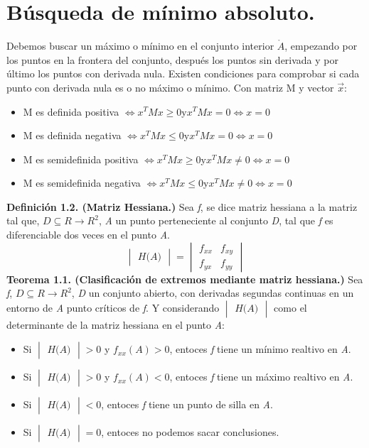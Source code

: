 \documentclass[a4paper,10pt]{article}
\begin{document}
\section{Búsqueda de mínimo absoluto.}
\noindent
Debemos buscar un máximo o mínimo en el conjunto interior $\mathring{A}$, empezando por los puntos en la frontera del conjunto, después los puntos sin derivada y por último los puntos con derivada nula. Existen condiciones para comprobar si cada punto con derivada nula es o no máximo o mínimo. Con matriz M y vector $\vec{x}$:
\begin{itemize}
\item M es definida positiva $\Longleftrightarrow x^TMx \geq 0$y$x^TMx=0\Leftrightarrow x=0$
\item M es definida negativa  $\Longleftrightarrow x^TMx \leq0$y$x^TMx=0\Leftrightarrow x=0$
\item M es semidefinida positiva  $\Longleftrightarrow x^TMx \geq0$y$x^TMx\neq0\Leftrightarrow x=0$
\item M es semidefinida negativa  $\Longleftrightarrow x^TMx \leq0$y$x^TMx\neq0\Leftrightarrow x=0$
\end{itemize}
\textbf{Definición 1.2. (Matriz Hessiana.)}
Sea \textit{f}, se dice matriz hessiana a la matriz tal que, $\textit{D} \subseteq R \rightarrow R^2$, \textit{A} un punto perteneciente al conjunto \textit{D}, tal que \textit{f} es diferenciable dos veces en el punto \textit{A}.
\[
\begin{vmatrix}\textit{H(A)}\end{vmatrix}=
\begin{vmatrix}
    f_{xx} & f_{xy} \\
    f_{yx} & f_{yy}
\end{vmatrix}
\]
\textbf{Teorema 1.1. (Clasificación de extremos mediante matriz hessiana.)}
Sea \textit{f}, $\textit{D} \subseteq R \rightarrow R^2$, \textit{D}  un conjunto abierto, con derivadas segundas continuas en un entorno de \textit{A} punto críticos de \textit{f}. Y considerando $\begin{vmatrix}\textit{H(A)}\end{vmatrix}$ como el determinante de la matriz hessiana en el punto \textit{A}:
\begin{itemize}
    \item Si $\begin{vmatrix}\textit{H(A)}\end{vmatrix}>0$ y $ f_{xx}(A)>0$, entoces \textit{f} tiene un mínimo realtivo en \textit{A}.
    \item Si $\begin{vmatrix}\textit{H(A)}\end{vmatrix}>0$ y $ f_{xx}(A)<0$, entoces \textit{f} tiene un máximo realtivo en \textit{A}.
    \item Si $\begin{vmatrix}\textit{H(A)}\end{vmatrix}<0$, entoces \textit{f} tiene un punto de silla en \textit{A}.
    \item Si $\begin{vmatrix}\textit{H(A)}\end{vmatrix}=0$, entoces no podemos sacar conclusiones.
\end{itemize}
\end{document}
